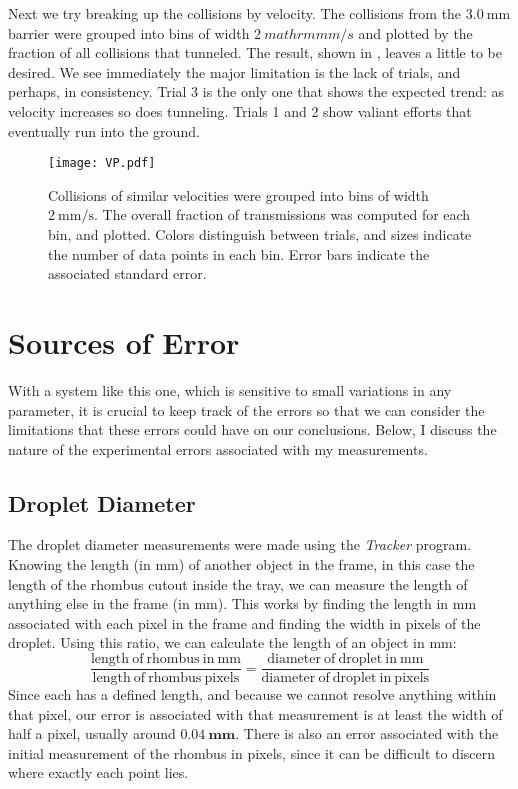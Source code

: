 Next we try breaking up the collisions by velocity. The collisions from the $3.0~\mathrm{mm}$ barrier were grouped into bins of width $2~mathrm{mm/s}$ and plotted by the fraction of all collisions that tunneled. The result, shown in , leaves a little to be desired. We see immediately the major limitation is the lack of trials, and perhaps, in consistency. Trial 3 is the only one that shows the expected trend: as velocity increases so does tunneling. Trials 1 and 2 show valiant efforts that eventually run into the ground. 


\begin{figure}[h!]
	\centering
	\texttt{[image: VP.pdf]}
	\caption{Collisions of similar velocities were grouped into bins of width $2~\mathrm{mm/s}$. The overall fraction of transmissions was computed for each bin, and plotted. Colors distinguish between trials, and sizes indicate the number of data points in each bin. Error bars indicate the associated standard error. }
	\label{vp}
\end{figure}


\section{Sources of Error}
\label{sect:error}

    With a system like this one, which is sensitive to small variations in any parameter, it is crucial to keep track of the errors so that we can consider the limitations that these errors could have on our conclusions. Below, I discuss the nature of the experimental errors associated with my measurements.
       
    \subsection{Droplet Diameter}
    The droplet diameter measurements were made using the \textit{Tracker} program. Knowing the length (in mm) of another object in the frame, in this case the length of the rhombus cutout inside the tray, we can measure the length of anything else in the frame (in mm). This works by finding the length in mm associated with each pixel in the frame and finding the width in pixels of the droplet. Using this ratio, we can calculate the length of an object in mm:   
$$ 
\frac{\mathrm{length~of~rhombus~in~mm}}{\mathrm{length~of~rhombus~pixels}}= \frac{\mathrm{diameter~of~droplet~in~mm}}{\mathrm{diameter~of~droplet~in~pixels}} 
$$ 
Since each has a defined length, and because we cannot resolve anything within that pixel, our error is associated with that measurement is at least the width of half a pixel, usually around $\mathbf{0.04~\mathrm{\textbf{mm}}}$. There is also an error associated with the initial measurement of the rhombus in pixels, since it can be difficult to discern where exactly each point lies.


